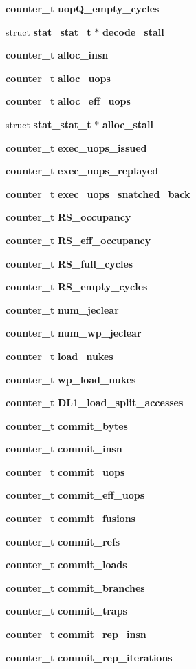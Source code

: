 \begin{CompactItemize}
{\bf counter\_\-t} {\bf uopQ\_\-empty\_\-cycles}
\item 
struct {\bf stat\_\-stat\_\-t} $\ast$ {\bf decode\_\-stall}
\item 
{\bf counter\_\-t} {\bf alloc\_\-insn}
\item 
{\bf counter\_\-t} {\bf alloc\_\-uops}
\item 
{\bf counter\_\-t} {\bf alloc\_\-eff\_\-uops}
\item 
struct {\bf stat\_\-stat\_\-t} $\ast$ {\bf alloc\_\-stall}
\item 
{\bf counter\_\-t} {\bf exec\_\-uops\_\-issued}
\item 
{\bf counter\_\-t} {\bf exec\_\-uops\_\-replayed}
\item 
{\bf counter\_\-t} {\bf exec\_\-uops\_\-snatched\_\-back}
\item 
{\bf counter\_\-t} {\bf RS\_\-occupancy}
\item 
{\bf counter\_\-t} {\bf RS\_\-eff\_\-occupancy}
\item 
{\bf counter\_\-t} {\bf RS\_\-full\_\-cycles}
\item 
{\bf counter\_\-t} {\bf RS\_\-empty\_\-cycles}
\item 
{\bf counter\_\-t} {\bf num\_\-jeclear}
\item 
{\bf counter\_\-t} {\bf num\_\-wp\_\-jeclear}
\item 
{\bf counter\_\-t} {\bf load\_\-nukes}
\item 
{\bf counter\_\-t} {\bf wp\_\-load\_\-nukes}
\item 
{\bf counter\_\-t} {\bf DL1\_\-load\_\-split\_\-accesses}
\item 
{\bf counter\_\-t} {\bf commit\_\-bytes}
\item 
{\bf counter\_\-t} {\bf commit\_\-insn}
\item 
{\bf counter\_\-t} {\bf commit\_\-uops}
\item 
{\bf counter\_\-t} {\bf commit\_\-eff\_\-uops}
\item 
{\bf counter\_\-t} {\bf commit\_\-fusions}
\item 
{\bf counter\_\-t} {\bf commit\_\-refs}
\item 
{\bf counter\_\-t} {\bf commit\_\-loads}
\item 
{\bf counter\_\-t} {\bf commit\_\-branches}
\item 
{\bf counter\_\-t} {\bf commit\_\-traps}
\item 
{\bf counter\_\-t} {\bf commit\_\-rep\_\-insn}
\item 
{\bf counter\_\-t} {\bf commit\_\-rep\_\-iterations}

\end{CompactItemize}
